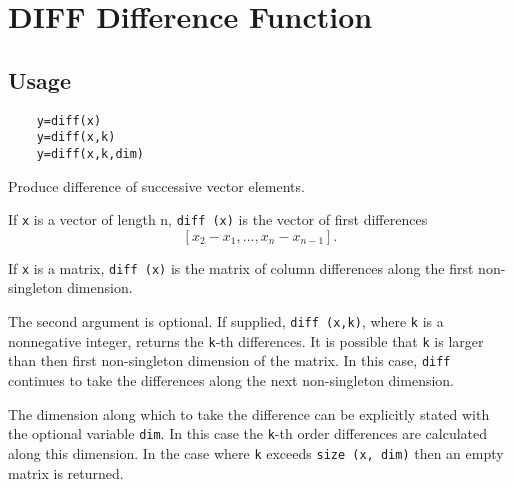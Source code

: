 \section{DIFF Difference Function}

\subsection{Usage}

\begin{verbatim}
	y=diff(x)
	y=diff(x,k)
	y=diff(x,k,dim)
\end{verbatim}
 Produce difference of successive vector elements.
 
 If \verb|x| is a vector of length n, \verb|diff (x)| is the
 vector of first differences
 \[
  [x_2 - x_1, ..., x_n - x_{n-1}].
 \]

 If \verb|x| is a matrix, \verb|diff (x)| is the matrix of column
 differences along the first non-singleton dimension.

 The second argument is optional.  If supplied, \verb|diff (x,k)|,
 where \verb|k| is a nonnegative integer, returns the
 \verb|k|-th differences. It is possible that \verb|k| is larger than
 then first non-singleton dimension of the matrix. In this case,
 \verb|diff| continues to take the differences along the next
 non-singleton dimension.

 The dimension along which to take the difference can be explicitly
 stated with the optional variable \verb|dim|. In this case the 
 \verb|k|-th order differences are calculated along this dimension.
 In the case where \verb|k| exceeds \verb|size (x, dim)|
 then an empty matrix is returned.


